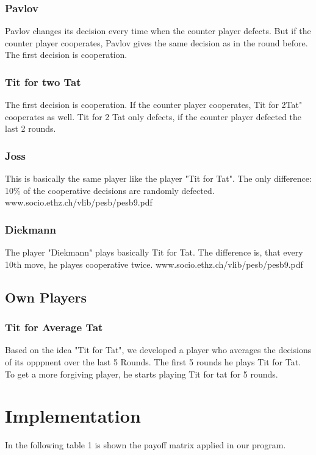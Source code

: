 \documentclass[11pt,twoside]{article}
\begin{document}
\subsubsection{Pavlov}
Pavlov changes its decision every time when the counter player defects. But if the counter player cooperates, Pavlov gives the same decision as in the round before. The first decision is cooperation. 

\subsubsection{Tit for two Tat}
The first decision is cooperation. If the counter player cooperates, Tit for 2Tat" cooperates as well. Tit for 2 Tat only defects, if the counter player defected the last 2 rounds.

\subsubsection{Joss}
This is basically the same player like the player "Tit for Tat". The only difference: 10\% of the cooperative decisions are randomly defected.
www.socio.ethz.ch/vlib/pesb/pesb9.pdf

\subsubsection{Diekmann}
The player "Diekmann" plays basically Tit for Tat. The difference is, that every 10th move, he playes cooperative twice.
www.socio.ethz.ch/vlib/pesb/pesb9.pdf

\subsection{Own Players}

\subsubsection{Tit for Average Tat}
Based on the idea "Tit for Tat", we developed a player who averages the decisions of its opppnent over the last 5 Rounds. The first 5 rounds he plays Tit for Tat. To get a more forgiving player, he starts playing Tit for tat for 5 rounds.

\subsubsection{}

\section{Implementation}
In the following table 1 is shown the payoff matrix applied in our program.
\end{document}
